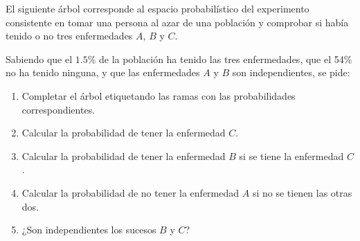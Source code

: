 {El siguiente árbol corresponde al espacio probabilístico del experimento consistente en tomar una persona al azar de una población y comprobar si había tenido o no tres enfermedades $A$, $B$ y $C$.

\begin{center}
\end{center}

Sabiendo que el $1.5$\% de la población ha tenido las tres enfermedades, que el 54\% no ha tenido ninguna, y que las enfermedades $A$ y $B$ son independientes, se pide:

\begin{enumerate}
\item Completar el árbol etiquetando las ramas con las probabilidades correspondientes.
\item Calcular la probabilidad de tener la enfermedad $C$.
\item Calcular la probabilidad de tener la enfermedad $B$ si se tiene la enfermedad $C$.
\item Calcular la probabilidad de no tener la enfermedad $A$ si no se tienen las otras dos.
\item ¿Son independientes los sucesos $B$ y $C$?
\end{enumerate}
}
